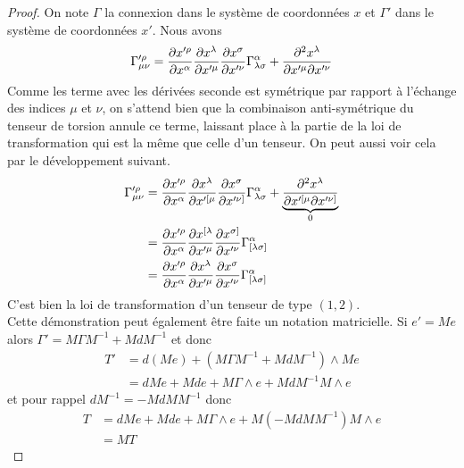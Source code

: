 \documentclass[a4paper,11pt]{report}
\begin{document}
                \begin{proof}
                    On note $\Gamma$ la connexion dans le système de coordonnées $x$ et $\Gamma'$ dans le système de coordonnées $x'$. Nous avons
                    \begin{equation}
                        \Gamma'^\rho_{\mu\nu} = \pdv{x'^\rho}{x^\alpha}\pdv{x^\lambda}{x'^\mu}\pdv{x^\sigma}{x'^\nu}\Gamma^\alpha_{\lambda\sigma}+\pdv{x^\lambda}{x'^\mu}{x'^\nu}
                    \end{equation}
                    Comme les terme avec les dérivées seconde est symétrique par rapport à l'échange des indices $\mu$ et $\nu$, on s'attend bien que la combinaison anti-symétrique du tenseur de torsion annule ce terme, laissant place à la partie de la loi de transformation qui est la même que celle d'un tenseur. On peut aussi voir cela par le développement suivant.
                    \begin{align}
                        \Gamma'^\rho_{\mu\nu} &= \pdv{x'^\rho}{x^\alpha}\pdv{x^\lambda}{x'^{[\mu}}\pdv{x^\sigma}{x'^{\nu]}}\Gamma^\alpha_{\lambda\sigma}+\underbrace{\pdv{x^\lambda}{x'^{[\mu}}{x'^{\nu]}}}_{0}\\
                        &= \pdv{x'^\rho}{x^\alpha}\pdv{x^{[\lambda}}{x'^{\mu}}\pdv{x^{\sigma]}}{x'^{\nu}}\Gamma^\alpha_{[\lambda\sigma]}\\
                        &= \pdv{x'^\rho}{x^\alpha}\pdv{x^{\lambda}}{x'^{\mu}}\pdv{x^{\sigma}}{x'^{\nu}}\Gamma^\alpha_{[\lambda\sigma]}
                    \end{align}
                    C'est bien la loi de transformation d'un tenseur de type $(1,2)$.\\ Cette démonstration peut également être faite un notation matricielle. Si $e' = Me$ alors $\Gamma' = M\Gamma M^{-1}+MdM^{-1}$ et donc
                    \begin{align}
                        T' &= d(Me) + (M\Gamma M^{-1}+MdM^{-1})\wedge Me\\
                        &= dM e + Mde + M\Gamma\wedge e + MdM^{-1}M\wedge e
                    \end{align}
                    et pour rappel $dM^{-1} = -MdMM^{-1}$ donc
                    \begin{align}
                        T &= dM e + Mde + M\Gamma\wedge e + M(-MdMM^{-1})M\wedge e\\
                        &= MT
                    \end{align}
                \end{proof}
                
\end{document}
